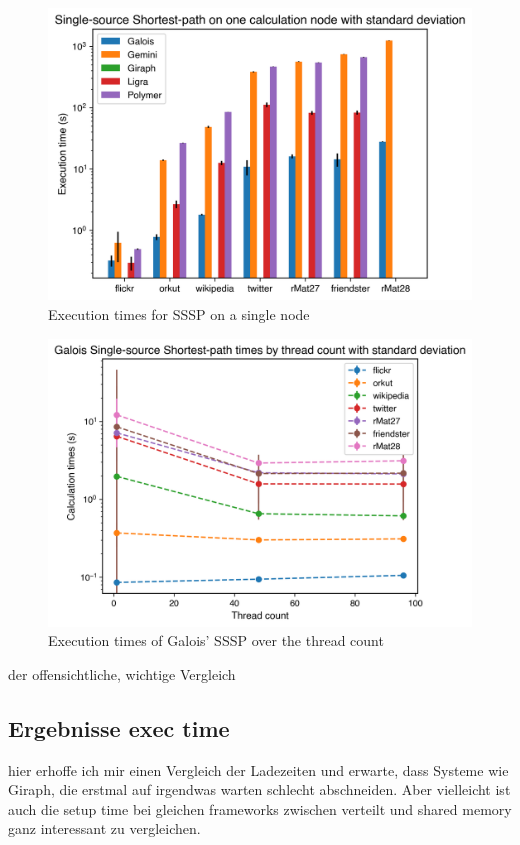 \begin{figure}
	\includegraphics[width=\columnwidth]{../../plots/singleNodeSSSP_execTime.png}
	\caption{Execution times for SSSP on a single node}
	\label{fig:singleNodeSSSP_exec}
\end{figure}


\begin{figure}
	\includegraphics[width=\columnwidth]{../../plots/singleNodeSSSPGaloisThreads.png}
	\caption{Execution times of Galois' SSSP over the thread count}
	\label{fig:singleNodeSSSPGaloisThreads}
\end{figure}
der offensichtliche, wichtige Vergleich

\subsection{Ergebnisse exec time}

hier erhoffe ich mir einen Vergleich der Ladezeiten und erwarte, dass Systeme wie Giraph, die erstmal auf irgendwas warten schlecht abschneiden.
Aber vielleicht ist auch die setup time bei gleichen frameworks zwischen verteilt und shared memory ganz interessant zu vergleichen. 

